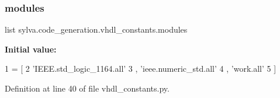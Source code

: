 \subsubsection{\texorpdfstring{modules}{modules}}
{\footnotesize\ttfamily list sylva.\+code\+\_\+generation.\+vhdl\+\_\+constants.\+modules}

{\bfseries Initial value\+:}
\begin{DoxyCode}
1 =  [
2           \textcolor{stringliteral}{'IEEE.std\_logic\_1164.all'}
3           , \textcolor{stringliteral}{'ieee.numeric\_std.all'}
4           , \textcolor{stringliteral}{'work.all'}
5           ]
\end{DoxyCode}


Definition at line 40 of file vhdl\+\_\+constants.\+py.

